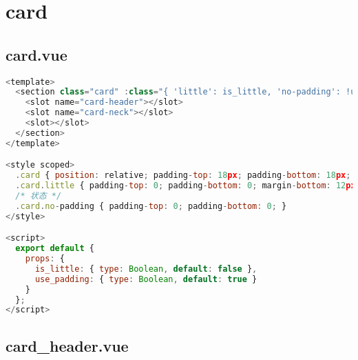 \begin{lstlisting}[language=JavaScript]

\end{lstlisting}






\begin{lstlisting}[language=JavaScript]

\end{lstlisting}




\chapter{card}

\section{card.vue}


\begin{lstlisting}[language=JavaScript]
<template>
  <section class="card" :class="{ 'little': is_little, 'no-padding': !use_padding }">
    <slot name="card-header"></slot>
    <slot name="card-neck"></slot>
    <slot></slot>
  </section>
</template>

<style scoped>
  .card { position: relative; padding-top: 18px; padding-bottom: 18px; }
  .card.little { padding-top: 0; padding-bottom: 0; margin-bottom: 12px; }
  /* 状态 */
  .card.no-padding { padding-top: 0; padding-bottom: 0; }
</style>

<script>
  export default {
    props: {
      is_little: { type: Boolean, default: false },
      use_padding: { type: Boolean, default: true }
    }
  };
</script>
\end{lstlisting}

\section{card\_header.vue}



